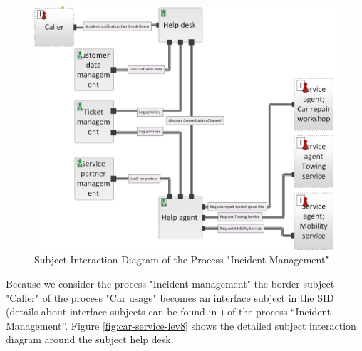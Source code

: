 \begin{figure}
	\centering
	\includegraphics[width=1.0\linewidth]{Figures/Chapter5/figures-hierarchy/Car-Service-Lev6}
	\caption[Subject Interaction Diagram of the Process "Incident Management"]{Subject Interaction Diagram of the Process "Incident Management"}
	\label{fig:car-service-lev6}
\end{figure}

Because we consider the process "Incident management" the border subject "Caller" of the process "Car usage" becomes an interface subject in the SID (details about interface subjects can be found in \cite{Flei12}) of the process “Incident Management”. Figure \ref{fig:car-service-lev8} shows the detailed subject interaction diagram around the subject help desk. \\

